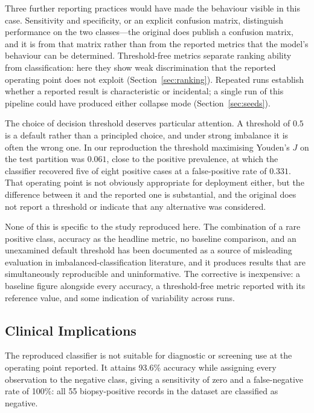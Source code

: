 Three further reporting practices would have made the behaviour visible in this
case. Sensitivity and specificity, or an explicit confusion matrix, distinguish
performance on the two classes---the original does publish a confusion matrix,
and it is from that matrix rather than from the reported metrics that the
model's behaviour can be determined. Threshold-free metrics separate ranking
ability from classification: here they show weak discrimination that the
reported operating point does not exploit
(Section~\ref{sec:ranking}). Repeated runs establish whether a reported result
is characteristic or incidental; a single run of this pipeline could have
produced either collapse mode (Section~\ref{sec:seeds}).

The choice of decision threshold deserves particular attention. A threshold of
$0.5$ is a default rather than a principled choice, and under strong imbalance
it is often the wrong one. In our reproduction the threshold maximising
Youden's $J$ on the test partition was $0.061$, close to the positive
prevalence, at which the classifier recovered five of eight positive cases at a
false-positive rate of $0.331$. That operating point is not obviously
appropriate for deployment either, but the difference between it and the
reported one is substantial, and the original does not report a threshold or
indicate that any alternative was considered.

None of this is specific to the study reproduced here. The combination of a
rare positive class, accuracy as the headline metric, no baseline comparison,
and an unexamined default threshold has been documented as a source of
misleading evaluation in imbalanced-classification literature, and it produces
results that are simultaneously reproducible and uninformative. The corrective is inexpensive: a baseline
figure alongside every accuracy, a threshold-free metric reported with its
reference value, and some indication of variability across runs.

\subsection{Clinical Implications}\label{sec:clinical}

The reproduced classifier is not suitable for diagnostic or screening use at
the operating point reported. It attains 93.6\% accuracy while assigning every
observation to the negative class, giving a sensitivity of zero and a
false-negative rate of 100\%: all 55 biopsy-positive records in the dataset are
classified as negative.

